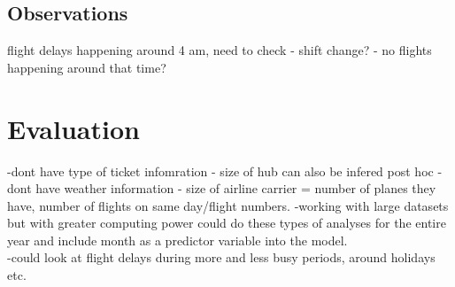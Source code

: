 \documentclass[a4paper, 10pt]{article}
\begin{document}
\subsection{Observations}
flight delays happening around 4 am, need to check
- shift change?
- no flights happening around that time?

\section{Evaluation}
-dont have type of ticket infomration
- size of hub can also be infered post hoc
- dont have weather information
- size of airline carrier = number of planes they have, number of flights on same day/flight numbers.
-working with large datasets but with greater computing power could do these types of analyses for the entire year and include month as a predictor variable into the model.\\
-could look at flight delays during more and less busy periods, around holidays etc.\\
\end{document}
